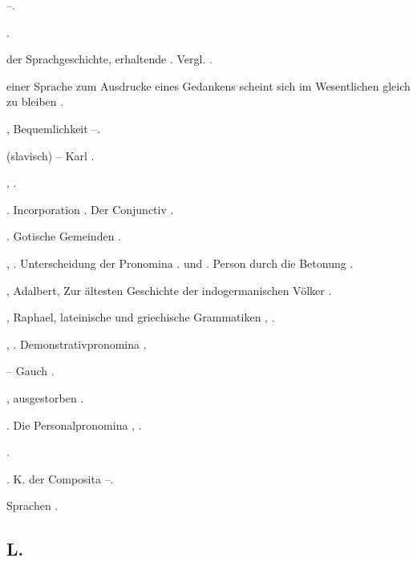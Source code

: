 \begin{register}
 \pageref{sp.277}–\pageref{sp.278}.

 \pageref{sp.383}.

 der Sprachgeschichte, erhaltende \pageref{sp.46}. Vergl. .

 einer Sprache zum Ausdrucke eines Gedankens scheint sich im Wesentlichen gleich zu bleiben \pageref{sp.243}.

, Bequemlichkeit \pageref{sp.182}–\pageref{sp.185}.

 (slavisch) – Karl \pageref{sp.230}.

,  \pageref{sp.265}.

 \pageref{sp.163}.  Incorporation \pageref{sp.358}. Der Conjunctiv \pageref{sp.359}. 

. Gotische Gemeinden \pageref{sp.146}.


 \pageref{sp.150}, \pageref{sp.282}. Unterscheidung der Pronomina \pageref{sp.1}. und \pageref{sp.2}. Person durch die Betonung \pageref{sp.379}.

, Adalbert, Zur ältesten Geschichte der indogermanischen Völker \pageref{sp.294}.


, Raphael, lateinische und griechische Grammatiken \pageref{sp.111}, \pageref{sp.112}.

 \pageref{sp.149}, \pageref{sp.257}. Demonstrativpronomina \pageref{sp.408}.

 – Gauch \pageref{sp.208}.

, ausgestorben \pageref{sp.146}.

 \pageref{sp.160}. Die Personalpronomina \pageref{sp.379}, \pageref{sp.408}.

 \pageref{sp.130}.

 \pageref{sp.101}. K. der Composita \pageref{sp.235}–\pageref{sp.236}. 

 Sprachen \pageref{sp.282}.

\subsection*{L.}\label{reg.L}


\end{register}

